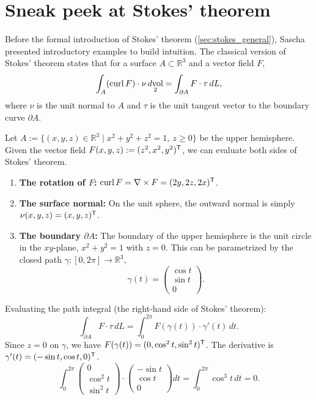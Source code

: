 
\section{Sneak peek at Stokes' theorem}
\label{sec:stokes_sneak_peek}

\begin{ainote}
Before the formal introduction of Stokes' theorem (\cref{sec:stokes_general}), Sascha presented introductory examples to build intuition. The classical version of Stokes' theorem states that for a surface $A \subset \mathbb{R}^3$ and a vector field $F$,
\[\int_A (\operatorname{curl} F)\cdot \nu \mathop{d\text{vol}}_2 = \int_{\partial A} F \cdot \tau \,dL,\]
where $\nu$ is the unit normal to $A$ and $\tau$ is the unit tangent vector to the boundary curve $\partial A$.
\end{ainote}

\begin{example}
\label{ex:stokes_hemisphere}
Let $A := \{(x,y,z) \in \mathbb{R}^3 \mid x^2+y^2+z^2=1,\ z \geq 0\}$ be the upper hemisphere.
Given the vector field $F(x,y,z) := (z^2, x^2, y^2)^{\mathsf{T}}$, we can evaluate both sides of Stokes' theorem.
\begin{enumerate}[label=\textbf{(\alph*)}]
    \item \textbf{The rotation of $F$:} $\operatorname{curl} F = \nabla \times F = (2y, 2z, 2x)^{\mathsf{T}}$.
    \item \textbf{The surface normal:} On the unit sphere, the outward normal is simply $\nu(x,y,z) = (x,y,z)^{\mathsf{T}}$.
    \item \textbf{The boundary $\partial A$:} The boundary of the upper hemisphere is the unit circle in the $xy$-plane, $x^2+y^2=1$ with $z=0$. This can be parametrized by the closed path $\gamma : [0,2\pi] \to \mathbb{R}^3$,
    \[\gamma(t) = \begin{pmatrix} \cos t \\ \sin t \\ 0 \end{pmatrix}.\]
\end{enumerate}
Evaluating the path integral (the right-hand side of Stokes' theorem):
\[\int_{\partial A} F \cdot \tau \,dL = \int_0^{2\pi} F(\gamma(t)) \cdot \gamma'(t) \,dt.\]
Since $z=0$ on $\gamma$, we have $F(\gamma(t)) = (0, \cos^2 t, \sin^2 t)^{\mathsf{T}}$. The derivative is $\gamma'(t) = (-\sin t, \cos t, 0)^{\mathsf{T}}$.
\[\int_0^{2\pi} \begin{pmatrix} 0 \\ \cos^2 t \\ \sin^2 t \end{pmatrix} \cdot \begin{pmatrix} -\sin t \\ \cos t \\ 0 \end{pmatrix} dt = \int_0^{2\pi} \cos^3 t \,dt = 0.\]
\end{example}

